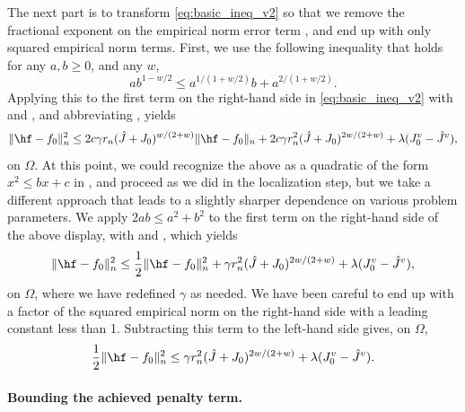 \documentclass{article}
\begin{document}
The next part is to transform \eqref{eq:basic_ineq_v2} so that we remove the
fractional exponent on the empirical norm error term ,
and end up with only squared empirical norm terms. First, we use the following
inequality that holds for any $a,b \geq 0$, and any $w$,    
\[
a b^{1-w/2} \leq a^{1/(1+w/2)} b + a^{2/(1+w/2)}.
\]
Applying this to the first term on the right-hand side in
\eqref{eq:basic_ineq_v2} with 
and , and abbreviating ,
yields 
\[
\|\hf - f_0\|_n^2 \leq 2c \gamma r_n ({\hat J} + J_0)^{w/(2+w)} \|\hf-f_0\|_n +
2c \gamma r_n^2 ({\hat J} + J_0)^{2w/(2+w)} + \lambda (J_0^v - {\hat J}^v), 
\]
on $\Omega$. At this point, we could recognize the above as a quadratic
of the form $x^2 \leq bx + c$ in , and proceed as we
did in the localization step, but we take a different approach that leads to a
slightly sharper dependence on various problem parameters. We apply $2ab \leq
a^2+b^2$ to the first term on the right-hand side of the above display, with
 and , which yields          
\[
\|\hf - f_0\|_n^2 \leq \frac{1}{2}\|\hf - f_0\|_n^2 + \gamma r_n^2 ({\hat J} +
J_0)^{2w/(2+w)} + \lambda (J_0^v - {\hat J}^v),   
\]
on $\Omega$, where we have redefined $\gamma$ as needed. We have been careful to 
end up with a factor of the squared empirical norm on the right-hand side with a
leading constant less than 1. Subtracting this term  to the left-hand side gives, on $\Omega$,
\begin{equation}
\label{eq:basic_ineq_v3}
\frac{1}{2} \|\hf - f_0\|_n^2 \leq \gamma r_n^2 ({\hat J} + J_0)^{2w/(2+w)} +
\lambda (J_0^v - {\hat J}^v).
\end{equation}

\paragraph{Bounding the achieved penalty term.}
\end{document}
